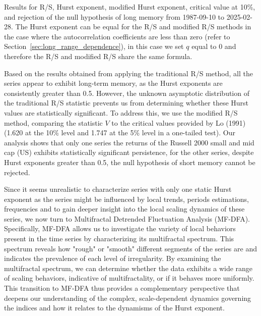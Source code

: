 \documentclass[11pt]{extarticle}
\begin{document}
\begin{table}[h!]
    \centering
    \caption{Results for R/S, Hurst exponent, modified Hurst exponent, critical value at 10\%, and rejection of the null
    hypothesis of long memory from 1987-09-10 to 2025-02-28. The Hurst exponent can be equal for the R/S and modified R/S methods in the case where
    the autocorrelation coefficients are less than zero (refer to Section~\ref{sec:long_range_dependence}), in this case we set $q$ equal to 0 and therefore the R/S and modified R/S share the same formula.}
    \label{tab:Hurst_results}
\end{table}

\FloatBarrier


Based on the results obtained from applying the traditional R/S method, all the series appear to exhibit long-term memory,
as the Hurst exponents are consistently greater than 0.5. However, the unknown asymptotic distribution of the traditional R/S
statistic prevents us from determining whether these Hurst values are statistically significant. To address this, we use the modified
R/S method, comparing the statistic \( V \) to the critical values provided by Lo (1991) (1.620 at the 10\% level and 1.747 at the 5\%
level in a one-tailed test). Our analysis shows that only one series the returns of the Russell 2000 small and mid cap (US) exhibits
statistically significant persistence, for the other series, despite Hurst exponents greater than 0.5, the null hypothesis of short memory cannot be rejected.

Since it seems unrealistic to characterize series with only one static Hurst exponent as the series might be influenced by local trends,
periods estimations, frequencies and to gain deeper insight into
the local scaling dynamics of these series, we now turn to Multifractal Detrended Fluctuation Analysis (MF-DFA).
Specifically, MF-DFA allows us to investigate the variety of local behaviors present in the time series by characterizing its multifractal
spectrum. This spectrum reveals how "rough" or "smooth" different segments of the series are and indicates the prevalence of each level of
irregularity. By examining the multifractal spectrum, we can determine whether the data exhibits a wide range of scaling behaviors, indicative
of multifractality, or if it behaves more uniformly. This transition to MF-DFA thus provides a complementary perspective that deepens our understanding
of the complex, scale-dependent dynamics governing the indices and how it relates to the dynamisms of the Hurst exponent.
\end{document}
